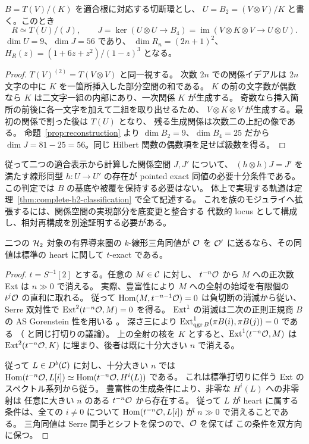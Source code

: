 \begin{proposition}
\label{prop:antiserre-quadratic}
$B=T(V)/(K)$ を適合根に対応する切断環とし、
$U=B_2=(V\otimes V)/K$ と書く。このとき
\[
 R\simeq T(U)/(J),\qquad
 J=\ker(U\otimes U\to B_4)
   =\operatorname{im}(V\otimes K\otimes V\to U\otimes U).
\]
$\dim U=9$、$\dim J=56$ であり、
$\dim R_n=(2n+1)^2$、$H_R(z)=(1+6z+z^2)/(1-z)^3$ となる。
\end{proposition}
\begin{proof}
$T(V)^{(2)}=T(V\otimes V)$ と同一視する。
次数 $2n$ での関係イデアルは $2n$ 文字の中に $K$ を一箇所挿入した部分空間の和である。
$K$ の前の文字数が偶数なら $K$ は二文字一組の内部にあり、一次関係 $K$ が生成する。
奇数なら挿入箇所の前後に各一文字を加えて二組を取り出せるため、
$V\otimes K\otimes V$ が生成する。最初の関係で割った後は $T(U)$ となり、
残る生成関係は次数二の上記の像である。
命題~\ref{prop:reconstruction} より $\dim B_2=9$、$\dim B_4=25$ だから
$\dim J=81-25=56$。同じ Hilbert 関数の偶数項を足せば級数を得る。
\end{proof}

従って二つの適合表示から計算した関係空間 $J,J'$ について、
$(h\otimes h)J=J'$ を満たす線形同型 $h:U\to U'$ の存在が
pointed exact 同値の必要十分条件である。
この判定では $B$ の基底や被覆を保持する必要はない。
体上で実現する軌道は定理~\ref{thm:complete-h2-classification} で全て記述する。
これを族のモジュライへ拡張するには、関係空間の実現部分を底変更と整合する
代数的 locus として構成し、相対再構成を別途証明する必要がある。

\begin{corollary}
\label{cor:pointed-derived-exact}
二つの $\mathcal H_2$ 対象の有界導来圏の $k$-線形三角同値が
$\mathcal O$ を $\mathcal O'$ に送るなら、その同値は標準の heart に関して $t$-exact である。
\end{corollary}
\begin{proof}
$t=S^{-1}[2]$ とする。任意の $M\in\mathcal C$ に対し、
$t^{-n}\mathcal O$ から $M$ への正次数 Ext は $n\gg0$ で消える。
実際、豊富性により $M$ への全射の始域を有限個の $t^j\mathcal O$ の直和に取れる。
従って $\operatorname{Hom}(M,t^{-n-1}\mathcal O)=0$ は負切断の消滅から従い、
Serre 双対性で $\operatorname{Ext}^2(t^{-n}\mathcal O,M)=0$ を得る。
$\operatorname{Ext}^1$ の消滅は二次の正則正規商 $B$ の AS Gorenstein 性を用いる
\cite[Lemma 2.4]{MU2022}。
深さ三により $\operatorname{Ext}^1_{\operatorname{qgr} B}(\pi B(i),\pi B(j))=0$ である
（\cite[Lemma 5.9(2)]{MU2021} と同じ打切りの議論）。
上の全射の核を $K$ とすると、$\operatorname{Ext}^1(t^{-n}\mathcal O,M)$ は
$\operatorname{Ext}^2(t^{-n}\mathcal O,K)$ に埋まり、後者は既に十分大きい $n$ で消える。

従って $L\in D^b(\mathcal C)$ に対し、十分大きい $n$ では
$\operatorname{Hom}(t^{-n}\mathcal O,L[i])\simeq\operatorname{Hom}(t^{-n}\mathcal O,H^i(L))$ である。
これは標準打切りに伴う Ext のスペクトル系列から従う。
豊富性の生成条件により、非零な $H^i(L)$ への非零射は
任意に大きい $n$ のある $t^{-n}\mathcal O$ から存在する。
従って $L$ が heart に属する条件は、全ての $i\ne0$ について
$\operatorname{Hom}(t^{-n}\mathcal O,L[i])$ が $n\gg0$ で消えることである。
三角同値は Serre 関手とシフトを保つので、$\mathcal O$ を保てば
この条件を双方向に保つ。
\end{proof}

